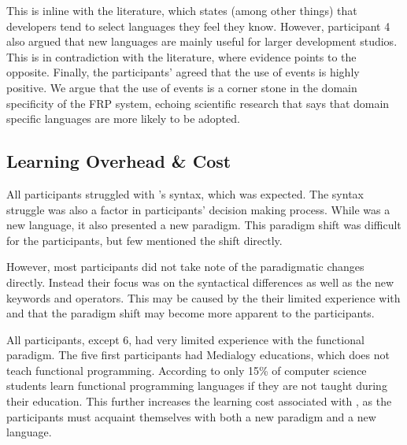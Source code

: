 This is inline with the literature, which states (among other things) that developers tend to select languages they feel they know\cite{meyerovich2013empirical}. However, participant 4 also argued that new languages are mainly useful for larger development studios. This is in contradiction with the literature, where evidence points to the opposite. Finally, the participants' agreed that the use of events is highly positive. We argue that the use of events is a corner stone in the domain specificity of the \gls{FRP} system, echoing scientific research that says that domain specific languages are more likely to be adopted\cite{meyerovich2013empirical}.

\subsection{Learning Overhead \& Cost}
All participants struggled with \fs's syntax, which was expected. The syntax struggle was also a factor in participants' decision making process. While \fs was a new language, it also presented a new paradigm. This paradigm shift was difficult for the participants, but few mentioned the shift directly.


However, most participants did not take note of the paradigmatic changes directly. Instead their focus was on the syntactical differences as well as the new keywords and operators. This may be caused by the their limited experience with \fs and that the paradigm shift may become more apparent to the participants.



All participants, except 6, had very limited experience with the functional paradigm. The five first participants had Medialogy educations, which does not teach functional programming. According to \cite{meyerovich2013empirical} only 15\% of computer science students learn functional programming languages if they are not taught during their education. This further increases the learning cost associated with \fs, as the participants must acquaint themselves with both a new paradigm and a new language.

